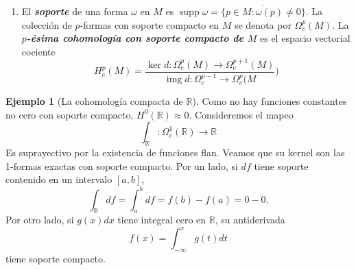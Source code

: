 \documentclass[spanish]{article}
\theoremstyle{definition}
\newtheorem*{ejem}{Ejemplo}
\newcommand{\R}{\mathbb{R}}
\DeclareMathOperator{\img}{img}
\DeclareMathOperator{\supp}{supp}
\begin{document}
\begin{enumerate}
\begin{enumerate}
			\item (Mayer-Vietoris) Supongamos que $\{U,V\}$ es una cubierta abierta de $M$. Las inclusiones
			\[\begin{tikzcd}[column sep=small,row sep=small]
				&U\arrow[dr,"k"]\\
				U\cap V\arrow[ru,"i"]\arrow[dr,swap,"j"]&&M\\
				&V\arrow[ru,swap,"l"]
			\end{tikzcd}\]
			inducen la siguiente sucesión exacta larga en cohomología:
			\[\begin{tikzcd}[column sep=small]
				\cdots\arrow[r,"\delta"]&H_{dR}^p\arrow[r,"k^*\oplus l^*"]&H_{dR}^p(U)\oplus H_{dR}^p(V)\arrow[r,"i^*-j^*"]&H_{dR}^p(U\cap V)\arrow[r,"\delta"]&H_{dR}^{p+1}(M)\arrow[r,"k^*\oplus l^*"]&\cdots
			\end{tikzcd}\]
		\end{enumerate}
		
		\item El \textbf{\textit{soporte}} de una forma $\omega$ en $M$ es $\supp \omega=\overline{\{p\in M:\omega(p)\neq0\}}$. La colección de $p$-formas con soporte compacto en $M$ se denota por $\Omega_c^p(M)$. La \textbf{\textit{$p$-ésima cohomología con soporte compacto de $M$}} es el espacio vectorial cociente
		\[H^p_c(M)=\frac{\ker d:\Omega_c^p(M)\to \Omega_c^{p+1}(M)}{\img d:\Omega_c^{p-1}\to\Omega_c^p(M})\]
	\end{enumerate}
	\begin{ejem}[La cohomología compacta de $\R$]
		Como no hay funciones constantes no cero con soporte compacto, $H^0(\R)\approx 0$. Consideremos el mapeo
		\[\int_\R:\Omega_c^1(\R)\to\R\]
		Es suprayectivo por la existencia de funciones flan. Veamos que su kernel son las 1-formas exactas con soporte compacto. Por un lado, si $df$ tiene soporte contenido en un intervalo $[a,b]$,
		\[\int_\R df=\int_a^bdf=f(b)-f(a)=0-0.\]
		Por otro lado, si $g(x)dx$ tiene integral cero en $\R$, su antiderivada
		\[f(x)=\int_{-\infty}^xg(t)dt\]
		tiene soporte compacto.			
	\end{ejem}
	\iffalse
	\begin{ejem}
		En general,
		\[H^p_c(\R^n)\approx\begin{cases}
			\begin{aligned}
				0\qquad&\text{si }p< n\\
				\R\qquad&\text{si }p=n
			\end{aligned}
		\end{cases}\]
	\end{ejem}
	\fi
	
\end{document}

